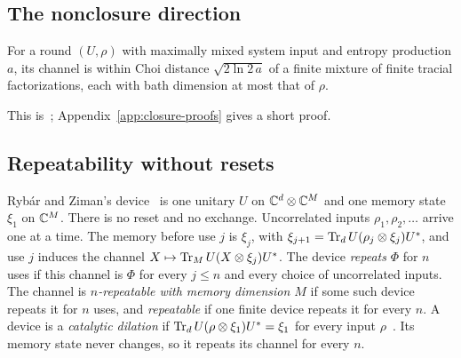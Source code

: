 \subsection{The nonclosure direction}

\begin{lemma}\label{lem:tracialization}
For a round $(U,\rho)$ with maximally mixed system input and entropy production $a$, its channel is within Choi distance
$\sqrt{2\ln2\,a}$ of a finite mixture of finite tracial factorizations, each with bath dimension at most that of $\rho$.
\end{lemma}
This is~\cite[Lemma~5.4]{DouglasMghirbiB}; Appendix~\ref{app:closure-proofs} gives a short proof.

\subsection{Repeatability without resets}\label{sec:repeatable}

Ryb\'ar and Ziman's device~\cite[Sections~II and~III]{RybarZiman2008} is one
unitary $U$ on $\mathbb C^d\otimes\mathbb C^M$ and one memory state $\xi_1$ on $\mathbb C^M$.
There is no reset and no exchange. Uncorrelated inputs
$\rho_1,\rho_2,\dots$ arrive one at a time. The memory before use $j$ is
$\xi_j$, with $\xi_{j+1}=\operatorname{Tr}_dU(\rho_j\otimes\xi_j)U^*$, and use $j$
induces the channel $X\mapsto\operatorname{Tr}_MU(X\otimes\xi_j)U^*$. The device
\emph{repeats} $\Phi$ for $n$ uses if this channel is $\Phi$ for every
$j\leq n$ and every choice of uncorrelated inputs. The channel is
\emph{$n$-repeatable with memory dimension $M$} if some such device
repeats it for $n$ uses, and \emph{repeatable} if one finite device
repeats it for every $n$. A device is a \emph{catalytic dilation} if
$\operatorname{Tr}_dU(\rho\otimes\xi_1)U^*=\xi_1$ for every input
$\rho$~\cite[Definition~2]{LieSonBoesNgWilming2026}. Its memory state
never changes, so it repeats its channel for every $n$.

